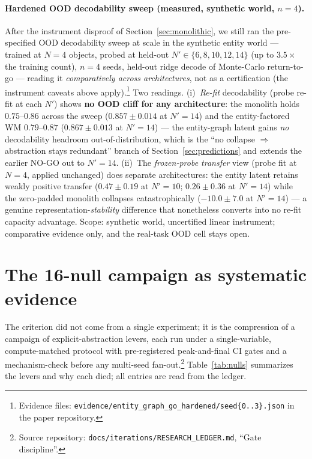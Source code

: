 \documentclass{article}
\begin{document}
\paragraph{Hardened OOD decodability sweep (measured, synthetic world, $n{=}4$).} After the instrument disproof of Section~\ref{sec:monolithic}, we still ran the pre-specified OOD decodability sweep at scale in the synthetic entity world --- trained at $N{=}4$ objects, probed at held-out $N' \in \{6,8,10,12,14\}$ (up to $3.5\times$ the training count), $n{=}4$ seeds, held-out ridge decode of Monte-Carlo return-to-go --- reading it \emph{comparatively across architectures}, not as a certification (the instrument caveats above apply).\footnote{Evidence files: \texttt{evidence/entity\_graph\_go\_hardened/seed\{0..3\}.json} in the paper repository.} Two readings. (i)~\emph{Re-fit} decodability (probe re-fit at each $N'$) shows \textbf{no OOD cliff for any architecture}: the monolith holds $0.75$--$0.86$ across the sweep ($0.857 \pm 0.014$ at $N'{=}14$) and the entity-factored WM $0.79$--$0.87$ ($0.867 \pm 0.013$ at $N'{=}14$) --- the entity-graph latent gains \emph{no} decodability headroom out-of-distribution, which is the ``no collapse $\Rightarrow$ abstraction stays redundant'' branch of Section~\ref{sec:predictions} and extends the earlier NO-GO out to $N'{=}14$. (ii)~The \emph{frozen-probe transfer} view (probe fit at $N{=}4$, applied unchanged) does separate architectures: the entity latent retains weakly positive transfer ($0.47 \pm 0.19$ at $N'{=}10$; $0.26 \pm 0.36$ at $N'{=}14$) while the zero-padded monolith collapses catastrophically ($-10.0 \pm 7.0$ at $N'{=}14$) --- a genuine representation-\emph{stability} difference that nonetheless converts into no re-fit capacity advantage. Scope: synthetic world, uncertified linear instrument; comparative evidence only, and the real-task OOD cell stays open.

\section{The 16-null campaign as systematic evidence}
\label{sec:campaign}

The criterion did not come from a single experiment; it is the compression of a campaign of explicit-abstraction levers, each run under a single-variable, compute-matched protocol with pre-registered peak-and-final CI gates \citep{agarwal2021rliable} and a mechanism-check before any multi-seed fan-out.\footnote{Source repository: \texttt{docs/iterations/RESEARCH\_LEDGER.md}, ``Gate discipline''.} Table~\ref{tab:nulls} summarizes the levers and why each died; all entries are read from the ledger.
\end{document}

